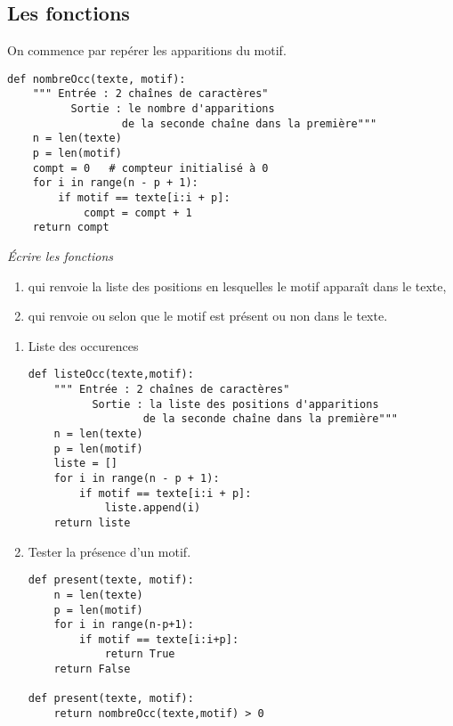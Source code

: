 \subsection*{Les fonctions}
On commence par repérer les apparitions du motif.
\begin{lstlisting}[caption={Compter les occurences d'un motif}]
def nombreOcc(texte, motif):
    """ Entrée : 2 chaînes de caractères"
          Sortie : le nombre d'apparitions 
                  de la seconde chaîne dans la première"""
    n = len(texte)
    p = len(motif)
    compt = 0   # compteur initialisé à 0
    for i in range(n - p + 1):
        if motif == texte[i:i + p]:
            compt = compt + 1
    return compt
\end{lstlisting}
\begin{Exercise}[title={Autres fonctions}]\it
Écrire les fonctions 
\begin{enumerate}
    \item {} qui renvoie la liste des positions en lesquelles le motif apparaît dans le texte,
    \item {} qui renvoie  ou  selon que le motif est présent ou non dans le texte.
\end{enumerate}
\end{Exercise}
\begin{Answer}
\begin{enumerate}
\item Liste des occurences
\begin{lstlisting}
def listeOcc(texte,motif):
    """ Entrée : 2 chaînes de caractères"
          Sortie : la liste des positions d'apparitions
                  de la seconde chaîne dans la première"""
    n = len(texte)
    p = len(motif)
    liste = []
    for i in range(n - p + 1):
        if motif == texte[i:i + p]:
            liste.append(i)
    return liste
\end{lstlisting}
\item Tester la présence d'un motif.
\begin{lstlisting}
def present(texte, motif):
    n = len(texte)
    p = len(motif)
    for i in range(n-p+1):
        if motif == texte[i:i+p]:
            return True
    return False
    
def present(texte, motif):
    return nombreOcc(texte,motif) > 0
\end{lstlisting}
\end{enumerate}
\end{Answer}

